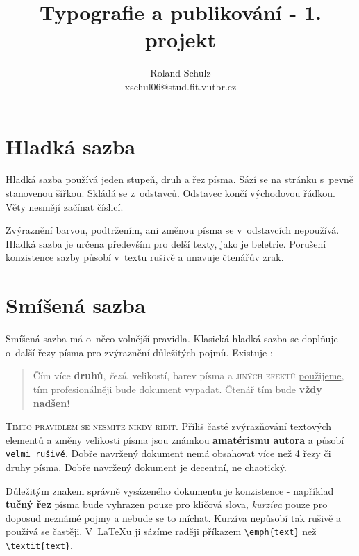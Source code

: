 \documentclass[twocolumn,a4paper,10pt]{article}
\begin{document}
\title{Typografie a publikování - 1. projekt}
\author{Roland Schulz \\ xschul06@stud.fit.vutbr.cz}
\date{}

\maketitle

\section{Hladká sazba}

Hladká sazba používá jeden stupeň, druh a řez písma.
Sází se na stránku s~pevně stanovenou šířkou.
Skládá se z~odstavců. Odstavec končí východovou řádkou.
Věty nesmějí začínat číslicí.

Zvýraznění barvou, podtržením, ani změnou písma se v~odstavcích nepoužívá.
Hladká sazba je určena především pro delší texty, jako je beletrie.
Porušení konzistence sazby působí v~textu rušivě a unavuje čtenářův zrak.


\section{Smíšená sazba}
\label{sec:smisena_sazba}

Smíšená sazba má o~něco volnější pravidla.
Klasická hladká sazba se doplňuje o~další řezy písma pro zvýraznění důležitých pojmů.
Existuje :
\begin{quotation}
Čím více \textbf{druhů}, \emph{řezů}, {\tiny velikostí}, {\color{green} barev} písma a {\color{blue} \textsc{jiných efektů}} \underline{použijeme}, {\color{red} tím profesionálněji} bude {dokument} vypadat.
Čtenář tím bude \textbf{\Huge{vždy nadšen!}}
\end{quotation}

\textsc{Tímto pravidlem se \underline{nesmíte nikdy řídit.}}
Příliš časté zvýrazňování textových elementů a změny \small{velikosti} písma jsou známkou \textbf{amatérismu autora} a působí \texttt{velmi rušivě}.
Dobře navržený dokument nemá obsahovat více než 4 řezy či druhy písma.
Dobře navržený dokument je \underline{decentní, ne chaotický}.

Důležitým znakem správně vysázeného dokumentu je konzistence - například \textbf{tučný řez} písma bude vyhrazen pouze pro klíčová slova, \emph{kurzíva} pouze pro doposud neznámé pojmy a nebude se to míchat.
Kurzíva nepůsobí tak rušivě a používá se častěji.
V~\LaTeX u ji sázíme raději příkazem \verb|\emph{text}| než \verb|\textit{text}|.
\end{document}
